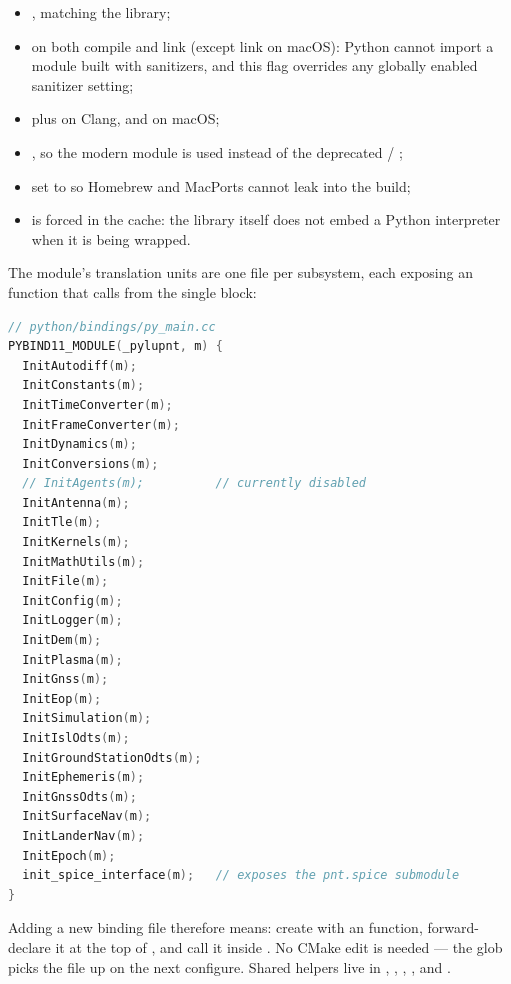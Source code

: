 \begin{itemize}[leftmargin=1.4em]
  \item {}, matching the library;
  \item {} on both compile and link (except link on
    macOS): Python cannot import a module built with sanitizers, and this flag
    overrides any globally enabled sanitizer setting;
  \item {} plus  on
    Clang, and  on macOS;
  \item {}, so the modern  module
    is used instead of the deprecated  /
    ;
  \item {} set to
     so Homebrew and MacPorts cannot leak into
    the build;
  \item {} is forced  in the cache: the
    library itself does not embed a Python interpreter when it is being wrapped.
\end{itemize}

The module's translation units are one file per subsystem, each exposing an
 function that
 calls from the single
 block:

\begin{lstlisting}[language=cpp]
// python/bindings/py_main.cc
PYBIND11_MODULE(_pylupnt, m) {
  InitAutodiff(m);
  InitConstants(m);
  InitTimeConverter(m);
  InitFrameConverter(m);
  InitDynamics(m);
  InitConversions(m);
  // InitAgents(m);          // currently disabled
  InitAntenna(m);
  InitTle(m);
  InitKernels(m);
  InitMathUtils(m);
  InitFile(m);
  InitConfig(m);
  InitLogger(m);
  InitDem(m);
  InitPlasma(m);
  InitGnss(m);
  InitEop(m);
  InitSimulation(m);
  InitIslOdts(m);
  InitGroundStationOdts(m);
  InitEphemeris(m);
  InitGnssOdts(m);
  InitSurfaceNav(m);
  InitLanderNav(m);
  InitEpoch(m);
  init_spice_interface(m);   // exposes the pnt.spice submodule
}
\end{lstlisting}

Adding a new binding file therefore means: create
 with an 
function, forward-declare it at the top of , and call it
inside . No CMake edit is needed --- the glob picks the
file up on the next configure. Shared helpers live in
, , ,
, and .

